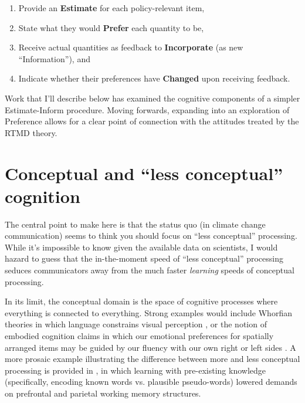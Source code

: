 \begin{enumerate}
\item Provide an \textbf{Estimate} for each policy-relevant item,
\item State what they would \textbf{Prefer} each quantity to be, 
\item Receive actual quantities as feedback to \textbf{Incorporate} (as new
``Information''), and 
\item Indicate whether their preferences have \textbf{Changed} upon receiving feedback.
\end{enumerate}

Work that I'll describe below has examined the cognitive components of a simpler
Estimate-Inform procedure. Moving forwards, expanding into an exploration of
Preference allows for a clear point of connection with the attitudes treated by
the RTMD theory.

\section{Conceptual and \texorpdfstring{``less conceptual''}{``less conceptual''} cognition}
\label{sec:two}

The central point to make here is that the status quo (in climate change
communication) seems to think you should focus on ``less conceptual''
processing. While it's impossible to know given the available data on
scientists, I would hazard to guess that the in-the-moment speed of ``less
conceptual'' processing seduces communicators away from the much faster
\emph{learning} speeds of conceptual processing.

In its limit, the conceptual domain is the space of cognitive processes where
everything is connected to everything. Strong examples would include Whorfian
theories in which language constrains visual perception
\cite{boroditsky_does_2001}, or the notion of embodied cognition claims in which
our emotional preferences for spatially arranged items may be guided by our
fluency with our own right or left sides \cite{casasanto_embodiment_2009}. A
more prosaic example illustrating the difference between more and less conceptual
processing is provided in \citeauthor{clark_assembling_2003}, in which learning with
pre-existing knowledge (specifically, encoding known words vs. plausible
pseudo-words) lowered demands on prefrontal and parietal working memory
structures.

